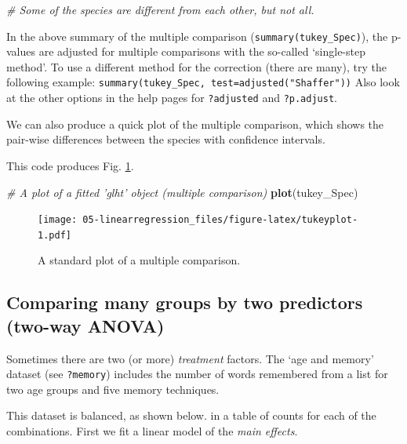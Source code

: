\documentclass[]{book}
\newenvironment{Shaded}{\begin{snugshade}}{\end{snugshade}}
\newcommand{\CommentTok}[1]{\textcolor[rgb]{0.56,0.35,0.01}{\textit{#1}}}
\newcommand{\KeywordTok}[1]{\textcolor[rgb]{0.13,0.29,0.53}{\textbf{#1}}}
\newcommand{\NormalTok}[1]{#1}
\let\BeginKnitrBlock\begin \let\EndKnitrBlock\end
\begin{document}
\begin{Shaded}
\begin{Highlighting}[]
\CommentTok{# Some of the species are different from each other, but not all.}
\end{Highlighting}
\end{Shaded}

\BeginKnitrBlock{rmdtry}
In the above summary of the multiple comparison (\texttt{summary(tukey\_Spec)}), the p-values are adjusted for multiple comparisons with the so-called `single-step method'. To use a different method for the correction (there are many), try the following example: \texttt{summary(tukey\_Spec,\ test=adjusted("Shaffer"))}
Also look at the other options in the help pages for \texttt{?adjusted} and \texttt{?p.adjust}.
\EndKnitrBlock{rmdtry}

We can also produce a quick plot of the multiple comparison, which shows the pair-wise differences between the species with confidence intervals.

This code produces Fig. \ref{fig:tukeyplot}.

\begin{Shaded}
\begin{Highlighting}[]
\CommentTok{# A plot of a fitted 'glht' object (multiple comparison)}
\KeywordTok{plot}\NormalTok{(tukey_Spec)}
\end{Highlighting}
\end{Shaded}

\begin{figure}
\centering
\texttt{[image: 05-linearregression\_files/figure-latex/tukeyplot-1.pdf]}
\caption{\label{fig:tukeyplot}A standard plot of a multiple comparison.}
\end{figure}

\hypertarget{twoway}{%
\subsection{Comparing many groups by two predictors (two-way ANOVA)}\label{twoway}}

Sometimes there are two (or more) \emph{treatment} factors. The `age and memory' dataset (see \texttt{?memory}) includes the number of words remembered from a list for two age groups and five memory techniques.

This dataset is balanced, as shown below. in a table of counts for each of the combinations. First we fit a linear model of the \emph{main effects}.
\end{document}
